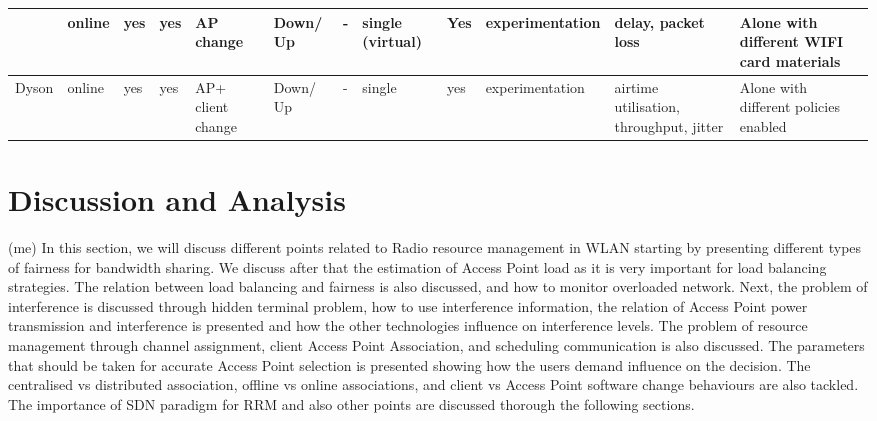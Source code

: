 \documentclass[journal,transmag]{IEEEtran}
\begin{document}
\begin{table}
\begin{tabular} {|p{}|p{.7cm} |p{.9cm}|p{.7cm}|p{.9cm}|p{.6cm}|p{}|p{}|p{} |p{1.7cm}|p{}|p{}|}
\scriptsize{\cite{17building_SDN_entreprise_virtual_AP}} &\scriptsize{online} &\scriptsize{yes} &\scriptsize{yes} &\scriptsize{AP change} &\scriptsize{Down/ Up} &\scriptsize{-} &\scriptsize{single (virtual)} &\scriptsize{Yes} &\scriptsize{experimentation} &\scriptsize{delay, packet loss} &\scriptsize{Alone with different WIFI card materials}\\\hline

\scriptsize{Dyson \cite{10Dyson}} &\scriptsize{online} &\scriptsize{yes} &\scriptsize{yes} &\scriptsize{AP+ client  change}  &\scriptsize{Down/ Up} &\scriptsize{-} &\scriptsize{single} &\scriptsize{yes} &\scriptsize{experimentation} &\scriptsize{airtime utilisation, throughput, jitter} &\scriptsize{Alone with different policies enabled} \\\hline 

\end{tabular}
\end{table} 


\section{Discussion and Analysis} (me)
\label{Discussion}
In this section, we will discuss different points related to Radio resource management in WLAN starting by presenting different types of fairness for bandwidth sharing. We discuss after that the estimation of Access Point load as it is very important for load balancing strategies. The relation between load balancing and fairness is also discussed, and how to monitor overloaded network. Next, the problem of interference is discussed through hidden terminal problem, how to use interference information, the relation of Access Point power transmission and interference is presented and how the other technologies influence on interference levels. The problem of resource management through channel assignment, client Access Point Association, and scheduling communication is also discussed. The parameters that should be taken for accurate Access Point selection is presented showing how the users demand influence on the decision. The centralised vs distributed association, offline vs online associations, and client vs Access Point software change behaviours are also tackled. The importance of SDN paradigm for RRM and also other points are discussed thorough the following sections.    
\end{document}
